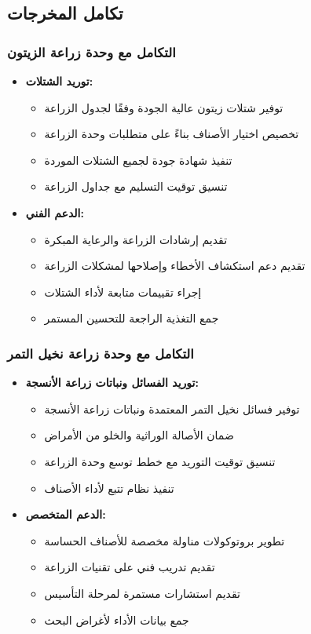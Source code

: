 \subsection{تكامل المخرجات}

\subsubsection{التكامل مع وحدة زراعة الزيتون}
\begin{itemize}
    \item \textbf{توريد الشتلات:}
    \begin{itemize}
        \item توفير شتلات زيتون عالية الجودة وفقًا لجدول الزراعة
        \item تخصيص اختيار الأصناف بناءً على متطلبات وحدة الزراعة
        \item تنفيذ شهادة جودة لجميع الشتلات الموردة
        \item تنسيق توقيت التسليم مع جداول الزراعة
    \end{itemize}
    
    \item \textbf{الدعم الفني:}
    \begin{itemize}
        \item تقديم إرشادات الزراعة والرعاية المبكرة
        \item تقديم دعم استكشاف الأخطاء وإصلاحها لمشكلات الزراعة
        \item إجراء تقييمات متابعة لأداء الشتلات
        \item جمع التغذية الراجعة للتحسين المستمر
    \end{itemize}
\end{itemize}

\subsubsection{التكامل مع وحدة زراعة نخيل التمر}
\begin{itemize}
    \item \textbf{توريد الفسائل ونباتات زراعة الأنسجة:}
    \begin{itemize}
        \item توفير فسائل نخيل التمر المعتمدة ونباتات زراعة الأنسجة
        \item ضمان الأصالة الوراثية والخلو من الأمراض
        \item تنسيق توقيت التوريد مع خطط توسع وحدة الزراعة
        \item تنفيذ نظام تتبع لأداء الأصناف
    \end{itemize}
    
    \item \textbf{الدعم المتخصص:}
    \begin{itemize}
        \item تطوير بروتوكولات مناولة مخصصة للأصناف الحساسة
        \item تقديم تدريب فني على تقنيات الزراعة
        \item تقديم استشارات مستمرة لمرحلة التأسيس
        \item جمع بيانات الأداء لأغراض البحث
    \end{itemize}
\end{itemize}

